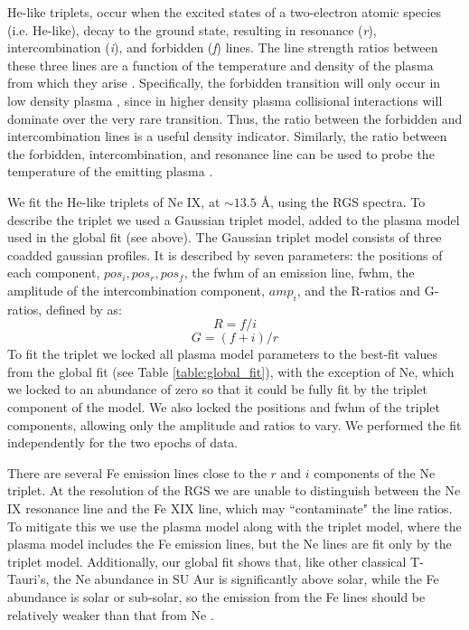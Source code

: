 He-like triplets, occur when the excited states of a two-electron atomic species (i.e. He-like), decay to the ground state, resulting in resonance (\textit{r}), intercombination (\textit{i}), and forbidden (\textit{f}) lines. The line strength ratios between these three lines are a function of the temperature and density of the plasma from which they arise \citesomething{}. Specifically, the forbidden transition will only occur in low density plasma \citep[e.g.][]{ness_helium-like_2001}, since in higher density plasma collisional interactions will dominate over the very rare transition. Thus, the ratio between the forbidden and intercombination lines is a useful density indicator. Similarly, the ratio between the forbidden, intercombination, and resonance line can be used to probe the temperature of the emitting plasma \citep[e.g.][]{schneider_multiepoch_2018}.

We fit the He-like triplets of Ne IX, at $\sim13.5$ \AA, using the RGS spectra. To describe the triplet we used a Gaussian triplet model, added to the plasma model used in the global fit (see above). The Gaussian triplet model consists of three coadded gaussian profiles. It is described by seven parameters: the positions of each component, $pos_i, pos_r, pos_f$, the fwhm of an emission line, fwhm, the amplitude of the intercombination component, $amp_i$, and the R-ratios and G- ratios, defined by \citet{pradhan_density_1981} as: 
\begin{equation}
    R = f/i
\end{equation}
\begin{equation}
    G = (f+i)/r
\end{equation}
To fit the triplet we locked all plasma model parameters to the best-fit values from the global fit (see Table \ref{table:global_fit}), with the exception of Ne, which we locked to an abundance of zero so that it could be fully fit by the triplet component of the model. We also locked the positions and fwhm of the triplet components, allowing only the amplitude and ratios to vary. We performed the fit independently for the two epochs of data.

There are several Fe emission lines close to the $r$ and $i$ components of the Ne triplet. At the resolution of the RGS we are unable to distinguish between the Ne IX resonance line and the Fe XIX line, which may ``contaminate" the line ratios. To mitigate this we use the plasma model along with the triplet model, where the plasma model includes the Fe emission lines, but the Ne lines are fit only by the triplet model. Additionally, our global fit shows that, like other classical T-Tauri's, the Ne abundance in SU Aur is significantly above solar, while the Fe abundance is solar or sub-solar, so the emission from the Fe lines should be relatively weaker than that from Ne \citep[e.g.][]{gunther_disk-bearing_2010}.

